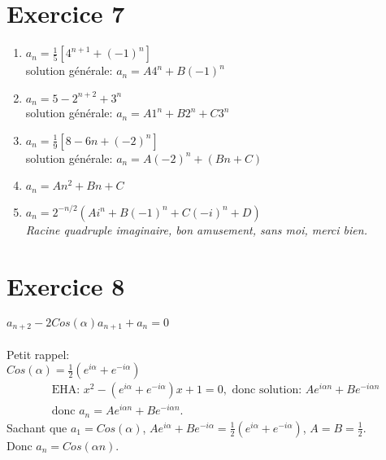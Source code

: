 \documentclass[fontsize=10pt]{article}
\begin{document}
\section*{Exercice 7}
\begin{enumerate}
\item $a_n = \frac{1}{5} \left[4^{n+1} + (-1)^n \right]$\\
solution générale: $a_n = A4^n + B(-1)^n$
\item $a_n = 5 - 2^{n+2} + 3^n$\\
solution générale: $a_n = A1^n + B2^n + C3^n$
\item $a_n = \frac{1}{9} \left[8 - 6n + (-2)^n\right]$\\
solution générale: $a_n = A(-2)^n + (Bn + C)$
\item $a_n = An^2 + Bn + C$
\item $a_n = 2^{-n/2}(Ai^n + B(-1)^n + C(-i)^n + D)$\\
\textit{Racine quadruple imaginaire, bon amusement, sans moi, merci bien.}
\end{enumerate}

\section*{Exercice 8}
$a_{n+2} - 2Cos(\alpha)a_{n+1} + a_n = 0$\\\\
Petit rappel:\\
$Cos(\alpha) = \frac{1}{2}(e^{i\alpha} + e^{-i\alpha})$\\
\begin{align*}
& \text{EHA: } x^2 - (e^{i\alpha} + e^{-i\alpha})x + 1 = 0, \text{ donc solution: } Ae^{i\alpha n} + Be^{-i\alpha n}\\
& \text{donc } a_n = Ae^{i\alpha n} + Be^{-i\alpha n}.
\end{align*}
Sachant que $a_1 = Cos(\alpha)$, $Ae^{i\alpha} + Be^{-i\alpha} = \frac{1}{2}(e^{i\alpha} + e^{-i\alpha})$, $A=B=\frac{1}{2}$.\\
Donc $a_n = Cos(\alpha n)$.
\end{document}
